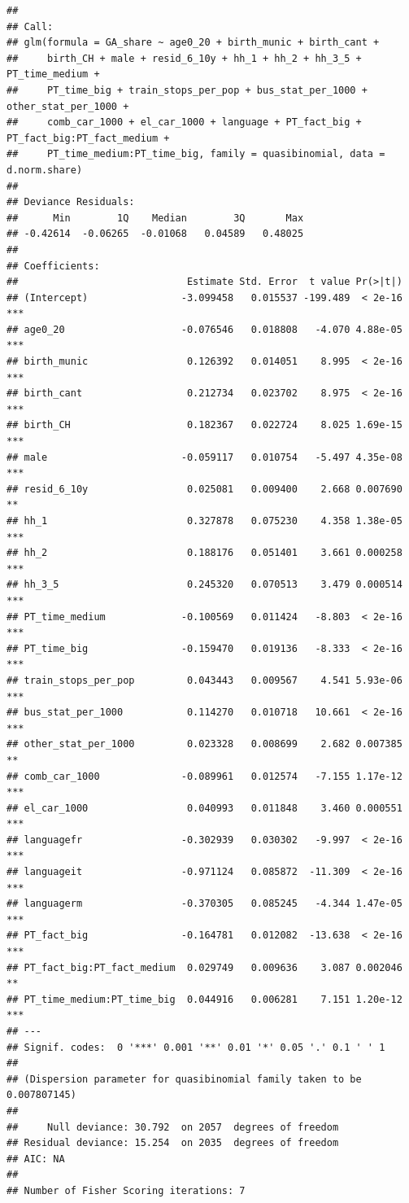 \documentclass[
]{article}
\begin{document}
\begin{verbatim}
## 
## Call:
## glm(formula = GA_share ~ age0_20 + birth_munic + birth_cant + 
##     birth_CH + male + resid_6_10y + hh_1 + hh_2 + hh_3_5 + PT_time_medium + 
##     PT_time_big + train_stops_per_pop + bus_stat_per_1000 + other_stat_per_1000 + 
##     comb_car_1000 + el_car_1000 + language + PT_fact_big + PT_fact_big:PT_fact_medium + 
##     PT_time_medium:PT_time_big, family = quasibinomial, data = d.norm.share)
## 
## Deviance Residuals: 
##      Min        1Q    Median        3Q       Max  
## -0.42614  -0.06265  -0.01068   0.04589   0.48025  
## 
## Coefficients:
##                             Estimate Std. Error  t value Pr(>|t|)    
## (Intercept)                -3.099458   0.015537 -199.489  < 2e-16 ***
## age0_20                    -0.076546   0.018808   -4.070 4.88e-05 ***
## birth_munic                 0.126392   0.014051    8.995  < 2e-16 ***
## birth_cant                  0.212734   0.023702    8.975  < 2e-16 ***
## birth_CH                    0.182367   0.022724    8.025 1.69e-15 ***
## male                       -0.059117   0.010754   -5.497 4.35e-08 ***
## resid_6_10y                 0.025081   0.009400    2.668 0.007690 ** 
## hh_1                        0.327878   0.075230    4.358 1.38e-05 ***
## hh_2                        0.188176   0.051401    3.661 0.000258 ***
## hh_3_5                      0.245320   0.070513    3.479 0.000514 ***
## PT_time_medium             -0.100569   0.011424   -8.803  < 2e-16 ***
## PT_time_big                -0.159470   0.019136   -8.333  < 2e-16 ***
## train_stops_per_pop         0.043443   0.009567    4.541 5.93e-06 ***
## bus_stat_per_1000           0.114270   0.010718   10.661  < 2e-16 ***
## other_stat_per_1000         0.023328   0.008699    2.682 0.007385 ** 
## comb_car_1000              -0.089961   0.012574   -7.155 1.17e-12 ***
## el_car_1000                 0.040993   0.011848    3.460 0.000551 ***
## languagefr                 -0.302939   0.030302   -9.997  < 2e-16 ***
## languageit                 -0.971124   0.085872  -11.309  < 2e-16 ***
## languagerm                 -0.370305   0.085245   -4.344 1.47e-05 ***
## PT_fact_big                -0.164781   0.012082  -13.638  < 2e-16 ***
## PT_fact_big:PT_fact_medium  0.029749   0.009636    3.087 0.002046 ** 
## PT_time_medium:PT_time_big  0.044916   0.006281    7.151 1.20e-12 ***
## ---
## Signif. codes:  0 '***' 0.001 '**' 0.01 '*' 0.05 '.' 0.1 ' ' 1
## 
## (Dispersion parameter for quasibinomial family taken to be 0.007807145)
## 
##     Null deviance: 30.792  on 2057  degrees of freedom
## Residual deviance: 15.254  on 2035  degrees of freedom
## AIC: NA
## 
## Number of Fisher Scoring iterations: 7
\end{verbatim}
\end{document}
